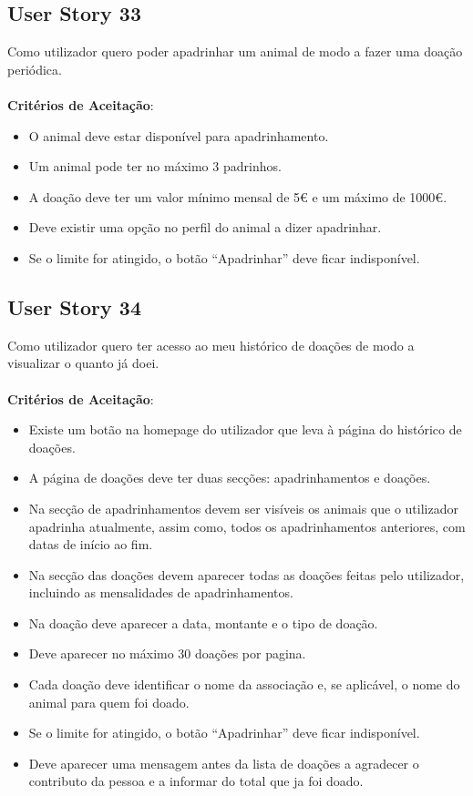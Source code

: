 \documentclass[a4paper,11pt]{article}
\begin{document}
\subsection*{User Story 33}
Como utilizador quero poder apadrinhar um animal de modo a fazer uma doação periódica.\\\\
\textbf{Critérios de Aceitação}:
\begin{itemize}
  \item O animal deve estar disponível para apadrinhamento.
  \item Um animal pode ter no máximo 3 padrinhos.
  \item A doação deve ter um valor mínimo mensal de 5€ e um máximo de 1000€.
  \item Deve existir uma opção no perfil do animal a dizer apadrinhar.
  \item Se o limite for atingido, o botão “Apadrinhar” deve ficar indisponível.
\end{itemize}

\subsection*{User Story 34}
Como utilizador quero ter acesso ao meu histórico de doações de modo a visualizar o quanto já doei.\\\\
\textbf{Critérios de Aceitação}:
\begin{itemize}
  \item Existe um botão na homepage do utilizador que leva à página do histórico de doações.
  \item A página de doações deve ter duas secções: apadrinhamentos e doações.
  \item Na secção de apadrinhamentos devem ser visíveis os animais que o utilizador apadrinha atualmente, assim como, todos os apadrinhamentos anteriores, com datas de início ao fim.
  \item Na secção das doações devem aparecer todas as doações feitas pelo utilizador, incluindo as mensalidades de apadrinhamentos.
  \item Na doação deve aparecer a data, montante e o tipo de doação.
  \item Deve aparecer no máximo 30 doações por pagina.
  \item Cada doação deve identificar o nome da associação e, se aplicável, o nome do animal para quem foi doado.
  \item Se o limite for atingido, o botão “Apadrinhar” deve ficar indisponível.
  \item Deve aparecer uma mensagem antes da lista de doações a agradecer o contributo da pessoa e a informar do total que ja foi doado.
\end{itemize}
\end{document}

